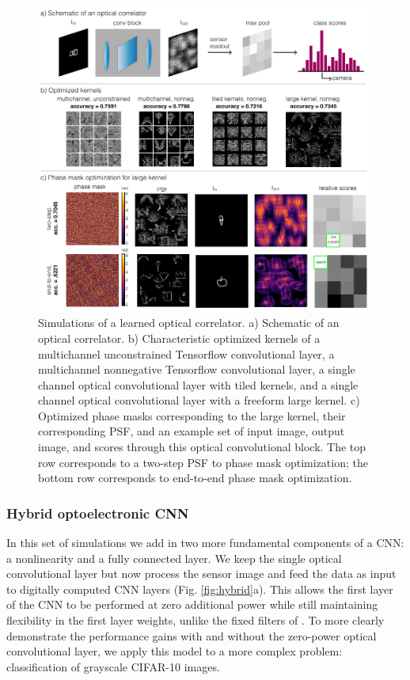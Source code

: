 \documentclass[fleqn,10pt]{wlscirep}
\begin{document}
\begin{figure}[ht]
\centering
\includegraphics[width=\linewidth]{correlator.pdf}
\caption{Simulations of a learned optical correlator. a) Schematic of an optical correlator. b) Characteristic optimized kernels of a multichannel unconstrained Tensorflow convolutional layer, a multichannel nonnegative Tensorflow convolutional layer, a single channel optical convolutional layer with tiled kernels, and a single channel optical convolutional layer with a freeform large kernel. c) Optimized phase masks corresponding to the large kernel, their corresponding PSF, and an example set of input image, output image, and scores through this optical convolutional block. The top row corresponds to a two-step PSF to phase mask optimization; the bottom row corresponds to end-to-end phase mask optimization.}
\label{fig:correlator}
\end{figure}

\subsubsection*{Hybrid optoelectronic CNN} 

In this set of simulations we add in two more fundamental components of a CNN: a nonlinearity and a fully connected layer. We keep the single optical convolutional layer but now process the sensor image and feed the data as input to digitally computed CNN layers (Fig. \ref{fig:hybrid}a). This allows the first layer of the CNN to be performed at zero additional power while still maintaining flexibility in the first layer weights, unlike the fixed filters of \cite{chen2016asp}. To more clearly demonstrate the performance gains with and without the zero-power optical convolutional layer, we apply this model to a more complex problem: classification of grayscale CIFAR-10 images. 
\end{document}
